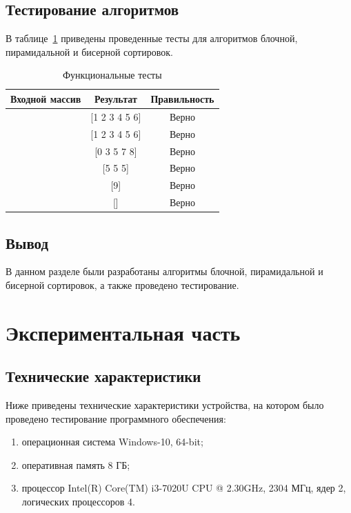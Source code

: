 \documentclass[a4paper,14pt, unknownkeysallowed]{extreport}
\begin{document}
\section{Тестирование алгоритмов}

В таблице~\ref{tbl:test} приведены проведенные тесты для алгоритмов блочной, пирамидальной и бисерной сортировок.

\begin{table}[h!]
	\begin{center}            
        \captionsetup{justification=raggedright,singlelinecheck=off}
		\caption{\label{tbl:test} Функциональные тесты}
		\begin{tabular}{|c|c|c|}
			\hline
            Входной массив & Результат & Правильность \\ 
			\hline
            [1 2 3 4 5 6] & [1 2 3 4 5 6] & Верно \\ 
			\hline
            [6 5 4 3 2 1] & [1 2 3 4 5 6] & Верно \\ 
			\hline
            [7 3 8 5 0] & [0 3 5 7 8] & Верно \\ 
			\hline
            [5 5 5] & [5 5 5] & Верно \\ 
			\hline
            [9] & [9] & Верно \\ 
			\hline
            [] & [] & Верно \\ 
			\hline
		\end{tabular}
	\end{center}
\end{table}

\section*{Вывод}
В данном разделе были разработаны алгоритмы блочной, пирамидальной и бисерной сортировок, а также проведено тестирование.
	
\chapter{Экспериментальная часть}
	
\section{Технические характеристики}
Ниже приведены технические характеристики устройства, на котором было проведено тестирование программного обеспечения:
	
\begin{enumerate}
	\item[1)] операционная система Windows-10, 64-bit;
	\item[2)] оперативная память 8 ГБ;
	\item[3)] процессор	Intel(R) Core(TM) i3-7020U CPU @ 2.30GHz, 2304 МГц, ядер 2, логических процессоров 4.
\end{enumerate}
	
\end{document}
